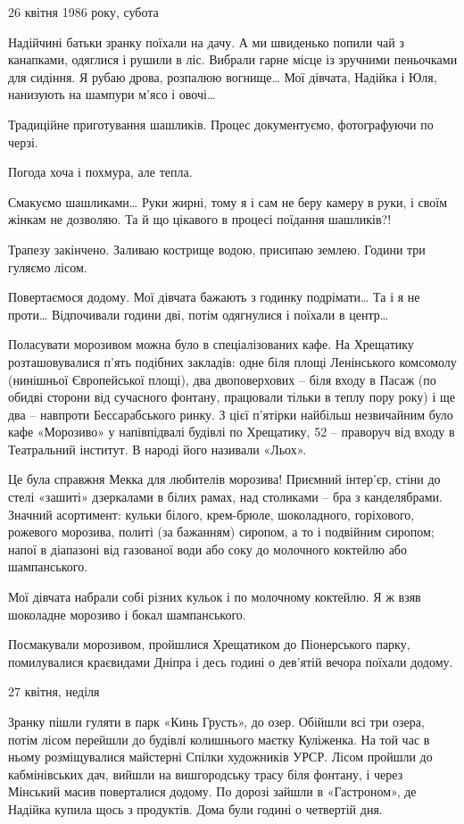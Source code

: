26 квітня 1986 року, субота 

Надійчині батьки зранку поїхали на дачу. А ми швиденько попили чай з канапками,
одяглися і рушили в ліс. Вибрали гарне місце із зручними пеньочками для
сидіння. Я рубаю дрова, розпалюю вогнище… Мої дівчата, Надійка і Юля, нанизують
на шампури м’ясо і овочі…

Традиційне приготування шашликів. Процес документуємо, фотографуючи по черзі.

Погода хоча і похмура, але тепла. 

Смакуємо шашликами… Руки жирні, тому я і сам не беру камеру в руки, і своїм
жінкам не дозволяю. Та й що цікавого в процесі поїдання шашликів?!

Трапезу закінчено. Заливаю кострище водою, присипаю землею. Години три гуляємо
лісом.

Повертаємося додому. Мої дівчата бажають з годинку подрімати… Та і я не проти…
Відпочивали години дві, потім одягнулися і поїхали в центр… 

Поласувати морозивом можна було в спеціалізованих кафе. На Хрещатику
розташовувалися п'ять подібних закладів: одне біля площі Ленінського комсомолу
(нинішньої Європейської площі), два двоповерхових – біля входу в Пасаж (по
обидві сторони від сучасного фонтану, працювали тільки в теплу пору року) і ще
два – навпроти Бессарабського ринку. З цієї п'ятірки найбільш незвичайним було
кафе «Морозиво» у напівпідвалі будівлі по Хрещатику, 52 – праворуч від входу в
Театральний інститут. В народі його називали «Льох».

Це була справжня Мекка для любителів морозива! Приємний інтер'єр, стіни до
стелі «зашиті» дзеркалами в білих рамах, над столиками – бра з канделябрами.
Значний асортимент: кульки білого, крем-брюле, шоколадного, горіхового,
рожевого морозива, политі (за бажанням) сиропом, а то і подвійним сиропом;
напої в діапазоні від газованої води або соку до молочного коктейлю або
шампанського. 

Мої дівчата набрали собі різних кульок і по молочному коктейлю. Я ж взяв
шоколадне морозиво і бокал шампанського. 

Посмакували морозивом, пройшлися Хрещатиком до Піонерського парку, помилувалися
краєвидами Дніпра і десь годині о дев’ятій вечора поїхали додому.

27 квітня, неділя 

Зранку пішли гуляти в парк «Кинь Грусть», до озер. Обійшли всі три озера, потім
лісом перейшли до будівлі колишнього маєтку Куліженка. На той час в ньому
розміщувалися майстерні Спілки художників УРСР. Лісом пройшли до кабмінівських
дач, вийшли на вишгородську трасу біля фонтану, і через Мінський масив
поверталися додому. По дорозі зайшли в «Гастроном», де Надійка купила щось з
продуктів. Дома були годині о четвертій дня. 


